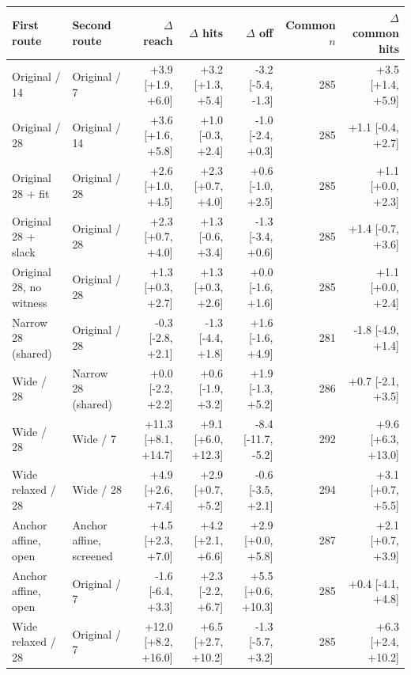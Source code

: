 \begin{tabular}{@{}llrrrrr@{}}
\toprule
First route & Second route & $\Delta$ reach & $\Delta$ hits & $\Delta$ off & Common $n$ & $\Delta$ common hits \\
\midrule
Original / 14 & Original / 7 & +3.9 [+1.9, +6.0] & +3.2 [+1.3, +5.4] & -3.2 [-5.4, -1.3] & 285 & +3.5 [+1.4, +5.9] \\
Original / 28 & Original / 14 & +3.6 [+1.6, +5.8] & +1.0 [-0.3, +2.4] & -1.0 [-2.4, +0.3] & 285 & +1.1 [-0.4, +2.7] \\
Original 28 + fit & Original / 28 & +2.6 [+1.0, +4.5] & +2.3 [+0.7, +4.0] & +0.6 [-1.0, +2.5] & 285 & +1.1 [+0.0, +2.3] \\
Original 28 + slack & Original / 28 & +2.3 [+0.7, +4.0] & +1.3 [-0.6, +3.4] & -1.3 [-3.4, +0.6] & 285 & +1.4 [-0.7, +3.6] \\
Original 28, no witness & Original / 28 & +1.3 [+0.3, +2.7] & +1.3 [+0.3, +2.6] & +0.0 [-1.6, +1.6] & 285 & +1.1 [+0.0, +2.4] \\
Narrow 28 (shared) & Original / 28 & -0.3 [-2.8, +2.1] & -1.3 [-4.4, +1.8] & +1.6 [-1.6, +4.9] & 281 & -1.8 [-4.9, +1.4] \\
Wide / 28 & Narrow 28 (shared) & +0.0 [-2.2, +2.2] & +0.6 [-1.9, +3.2] & +1.9 [-1.3, +5.2] & 286 & +0.7 [-2.1, +3.5] \\
Wide / 28 & Wide / 7 & +11.3 [+8.1, +14.7] & +9.1 [+6.0, +12.3] & -8.4 [-11.7, -5.2] & 292 & +9.6 [+6.3, +13.0] \\
Wide relaxed / 28 & Wide / 28 & +4.9 [+2.6, +7.4] & +2.9 [+0.7, +5.2] & -0.6 [-3.5, +2.1] & 294 & +3.1 [+0.7, +5.5] \\
Anchor affine, open & Anchor affine, screened & +4.5 [+2.3, +7.0] & +4.2 [+2.1, +6.6] & +2.9 [+0.0, +5.8] & 287 & +2.1 [+0.7, +3.9] \\
Anchor affine, open & Original / 7 & -1.6 [-6.4, +3.3] & +2.3 [-2.2, +6.7] & +5.5 [+0.6, +10.3] & 285 & +0.4 [-4.1, +4.8] \\
Wide relaxed / 28 & Original / 7 & +12.0 [+8.2, +16.0] & +6.5 [+2.7, +10.2] & -1.3 [-5.7, +3.2] & 285 & +6.3 [+2.4, +10.2] \\
\bottomrule
\end{tabular}
